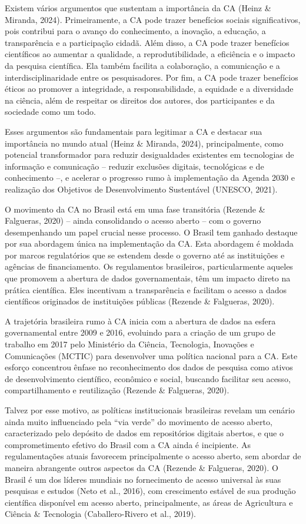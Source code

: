 \documentclass[
  a4paper,
]{book}
\begin{document}
Existem vários argumentos que sustentam a importância da CA (Heinz \&
Miranda, 2024). Primeiramente, a CA pode trazer benefícios sociais
significativos, pois contribui para o avanço do conhecimento, a
inovação, a educação, a transparência e a participação cidadã. Além
disso, a CA pode trazer benefícios científicos ao aumentar a qualidade,
a reprodutibilidade, a eficiência e o impacto da pesquisa científica.
Ela também facilita a colaboração, a comunicação e a
interdisciplinaridade entre os pesquisadores. Por fim, a CA pode trazer
benefícios éticos ao promover a integridade, a responsabilidade, a
equidade e a diversidade na ciência, além de respeitar os direitos dos
autores, dos participantes e da sociedade como um todo.

Esses argumentos são fundamentais para legitimar a CA e destacar sua
importância no mundo atual (Heinz \& Miranda, 2024), principalmente,
como potencial transformador para reduzir desigualdades existentes em
tecnologias de informação e comunicação -- reduzir exclusões digitais,
tecnológicas e de conhecimento --, e acelerar o progresso rumo à
implementação da Agenda 2030 e realização dos Objetivos de
Desenvolvimento Sustentável (UNESCO, 2021).

O movimento da CA no Brasil está em uma fase transitória (Rezende \&
Falgueras, 2020) -- ainda consolidando o acesso aberto -- com o governo
desempenhando um papel crucial nesse processo. O Brasil tem ganhado
destaque por sua abordagem única na implementação da CA. Esta abordagem
é moldada por marcos regulatórios que se estendem desde o governo até as
instituições e agências de financiamento. Os regulamentos brasileiros,
particularmente aqueles que promovem a abertura de dados governamentais,
têm um impacto direto na prática científica. Eles incentivam a
transparência e facilitam o acesso a dados científicos originados de
instituições públicas (Rezende \& Falgueras, 2020).

A trajetória brasileira rumo à CA inicia com a abertura de dados na
esfera governamental entre 2009 e 2016, evoluindo para a criação de um
grupo de trabalho em 2017 pelo Ministério da Ciência, Tecnologia,
Inovações e Comunicações (MCTIC) para desenvolver uma política nacional
para a CA. Este esforço concentrou ênfase no reconhecimento dos dados de
pesquisa como ativos de desenvolvimento científico, econômico e social,
buscando facilitar seu acesso, compartilhamento e reutilização (Rezende
\& Falgueras, 2020).

Talvez por esse motivo, as políticas institucionais brasileiras revelam
um cenário ainda muito influenciado pela ``via verde'' do movimento de
acesso aberto, caracterizado pelo depósito de dados em repositórios
digitais abertos, e que o comprometimento efetivo do Brasil com a CA
ainda é incipiente. As regulamentações atuais favorecem principalmente o
acesso aberto, sem abordar de maneira abrangente outros aspectos da CA
(Rezende \& Falgueras, 2020). O Brasil é um dos líderes mundiais no
fornecimento de acesso universal às suas pesquisas e estudos (Neto et
al., 2016), com crescimento estável de sua produção científica
disponível em acesso aberto, principalmente, as áreas de Agricultura e
Ciência \& Tecnologia (Caballero-Rivero et al., 2019).
\end{document}
